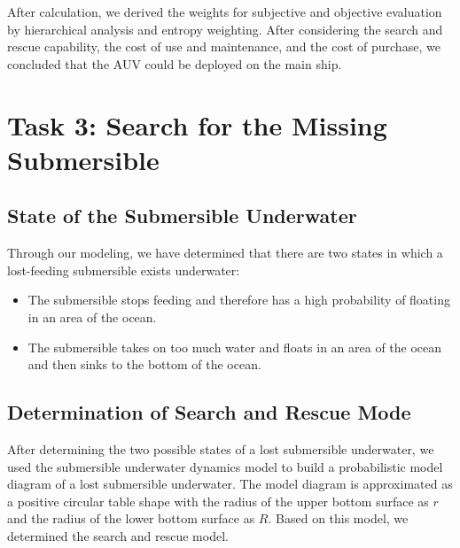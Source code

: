 \documentclass[12pt]{article}
\begin{document}
After calculation, we derived the weights for subjective and objective evaluation by hierarchical analysis and entropy weighting. After considering the search and rescue capability, the cost of use and maintenance, and the cost of purchase, we concluded that the AUV could be deployed on the main ship.

\section{Task 3: Search for the Missing Submersible}

\subsection{State of the Submersible Underwater}

Through our modeling, we have determined that there are two states in which a lost-feeding submersible exists underwater:

\begin{itemize}
    \item The submersible stops feeding and therefore has a high probability of floating in an area of the ocean.
    \item The submersible takes on too much water and floats in an area of the ocean and then sinks to the bottom of the ocean.
\end{itemize}

\subsection{Determination of Search and Rescue Mode}

After determining the two possible states of a lost submersible underwater, we used the submersible underwater dynamics model to build a probabilistic model diagram of a lost submersible underwater. The model diagram is approximated as a positive circular table shape with the radius of the upper bottom surface as $r$ and the radius of the lower bottom surface as $R$. Based on this model, we determined the search and rescue model.
\end{document}
